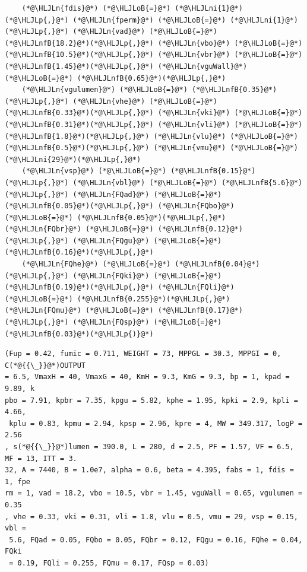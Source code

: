 \documentclass[12pt,a4paper]{article}
\newcommand{\HLJLn}[1]{#1}
\newcommand{\HLJLnfB}[1]{\textcolor[RGB]{59,151,46}{#1}}
\newcommand{\HLJLni}[1]{\textcolor[RGB]{59,151,46}{#1}}
\newcommand{\HLJLoB}[1]{\textcolor[RGB]{102,102,102}{\textbf{#1}}}
\newcommand{\HLJLp}[1]{#1}
\begin{document}
\begin{lstlisting}
    (*@\HLJLn{fdis}@*) (*@\HLJLoB{=}@*) (*@\HLJLni{1}@*)(*@\HLJLp{,}@*) (*@\HLJLn{fperm}@*) (*@\HLJLoB{=}@*) (*@\HLJLni{1}@*)(*@\HLJLp{,}@*) (*@\HLJLn{vad}@*) (*@\HLJLoB{=}@*) (*@\HLJLnfB{18.2}@*)(*@\HLJLp{,}@*) (*@\HLJLn{vbo}@*) (*@\HLJLoB{=}@*) (*@\HLJLnfB{10.5}@*)(*@\HLJLp{,}@*) (*@\HLJLn{vbr}@*) (*@\HLJLoB{=}@*) (*@\HLJLnfB{1.45}@*)(*@\HLJLp{,}@*) (*@\HLJLn{vguWall}@*) (*@\HLJLoB{=}@*) (*@\HLJLnfB{0.65}@*)(*@\HLJLp{,}@*)
    (*@\HLJLn{vgulumen}@*) (*@\HLJLoB{=}@*) (*@\HLJLnfB{0.35}@*)(*@\HLJLp{,}@*) (*@\HLJLn{vhe}@*) (*@\HLJLoB{=}@*) (*@\HLJLnfB{0.33}@*)(*@\HLJLp{,}@*) (*@\HLJLn{vki}@*) (*@\HLJLoB{=}@*) (*@\HLJLnfB{0.31}@*)(*@\HLJLp{,}@*) (*@\HLJLn{vli}@*) (*@\HLJLoB{=}@*) (*@\HLJLnfB{1.8}@*)(*@\HLJLp{,}@*) (*@\HLJLn{vlu}@*) (*@\HLJLoB{=}@*) (*@\HLJLnfB{0.5}@*)(*@\HLJLp{,}@*) (*@\HLJLn{vmu}@*) (*@\HLJLoB{=}@*) (*@\HLJLni{29}@*)(*@\HLJLp{,}@*)
    (*@\HLJLn{vsp}@*) (*@\HLJLoB{=}@*) (*@\HLJLnfB{0.15}@*)(*@\HLJLp{,}@*) (*@\HLJLn{vbl}@*) (*@\HLJLoB{=}@*) (*@\HLJLnfB{5.6}@*)(*@\HLJLp{,}@*) (*@\HLJLn{FQad}@*) (*@\HLJLoB{=}@*) (*@\HLJLnfB{0.05}@*)(*@\HLJLp{,}@*) (*@\HLJLn{FQbo}@*) (*@\HLJLoB{=}@*) (*@\HLJLnfB{0.05}@*)(*@\HLJLp{,}@*) (*@\HLJLn{FQbr}@*) (*@\HLJLoB{=}@*) (*@\HLJLnfB{0.12}@*)(*@\HLJLp{,}@*) (*@\HLJLn{FQgu}@*) (*@\HLJLoB{=}@*) (*@\HLJLnfB{0.16}@*)(*@\HLJLp{,}@*)
    (*@\HLJLn{FQhe}@*) (*@\HLJLoB{=}@*) (*@\HLJLnfB{0.04}@*)(*@\HLJLp{,}@*) (*@\HLJLn{FQki}@*) (*@\HLJLoB{=}@*) (*@\HLJLnfB{0.19}@*)(*@\HLJLp{,}@*) (*@\HLJLn{FQli}@*) (*@\HLJLoB{=}@*) (*@\HLJLnfB{0.255}@*)(*@\HLJLp{,}@*) (*@\HLJLn{FQmu}@*) (*@\HLJLoB{=}@*) (*@\HLJLnfB{0.17}@*)(*@\HLJLp{,}@*) (*@\HLJLn{FQsp}@*) (*@\HLJLoB{=}@*) (*@\HLJLnfB{0.03}@*)(*@\HLJLp{)}@*)
\end{lstlisting}

\begin{lstlisting}
(Fup = 0.42, fumic = 0.711, WEIGHT = 73, MPPGL = 30.3, MPPGI = 0, C(*@{{\_}}@*)OUTPUT 
= 6.5, VmaxH = 40, VmaxG = 40, KmH = 9.3, KmG = 9.3, bp = 1, kpad = 9.89, k
pbo = 7.91, kpbr = 7.35, kpgu = 5.82, kphe = 1.95, kpki = 2.9, kpli = 4.66,
 kplu = 0.83, kpmu = 2.94, kpsp = 2.96, kpre = 4, MW = 349.317, logP = 2.56
, s(*@{{\_}}@*)lumen = 390.0, L = 280, d = 2.5, PF = 1.57, VF = 6.5, MF = 13, ITT = 3.
32, A = 7440, B = 1.0e7, alpha = 0.6, beta = 4.395, fabs = 1, fdis = 1, fpe
rm = 1, vad = 18.2, vbo = 10.5, vbr = 1.45, vguWall = 0.65, vgulumen = 0.35
, vhe = 0.33, vki = 0.31, vli = 1.8, vlu = 0.5, vmu = 29, vsp = 0.15, vbl =
 5.6, FQad = 0.05, FQbo = 0.05, FQbr = 0.12, FQgu = 0.16, FQhe = 0.04, FQki
 = 0.19, FQli = 0.255, FQmu = 0.17, FQsp = 0.03)
\end{lstlisting}
\end{document}
